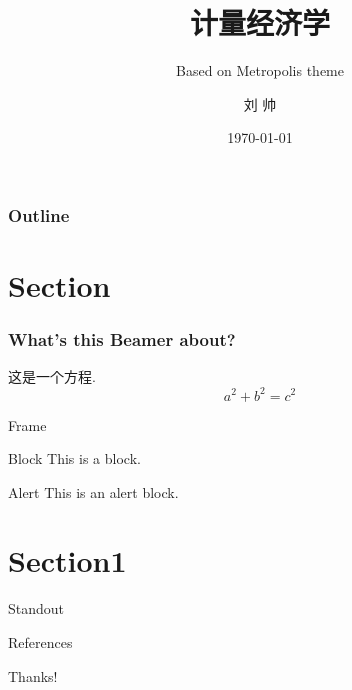 \documentclass[aspectratio=169, 10pt]{beamer}
\title{计量经济学}
\subtitle{Based on Metropolis theme}
\author[LIU ShHUAI]{刘 {  } 帅}
\institute{山西师范大学 {  } 经济与管理学院}
\date{\today}
\begin{document}
\maketitle

\begin{frame}[plain]
    \frametitle{Outline}
    \tableofcontents[hideallsubsections]
  \end{frame}

\section{Section}

\begin{frame}[plain]
    \frametitle{What's this Beamer about?}
    这是一个方程. $$ a^2 + b^2 = c^2 $$
\end{frame}

\begin{frame}{Frame}
    \begin{block}{Block}
        This is a block.
    \end{block}

    \begin{alertblock}{Alert}
        This is an \alert{alert} block.
    \end{alertblock}

\end{frame}

\section{Section1}

\begin{frame}[standout]
    Standout
\end{frame}

\begin{frame}[allowframebreaks]{References}
    \nocite{einstein}
    \nocite{knuthwebsite}
    \nocite{dirac}
    \printbibliography[heading=none]
\end{frame}


\begin{frame}[standout]
    \begin{center}
        {\Huge\calligra Thanks!}
      \end{center}
\end{frame}
\end{document}
